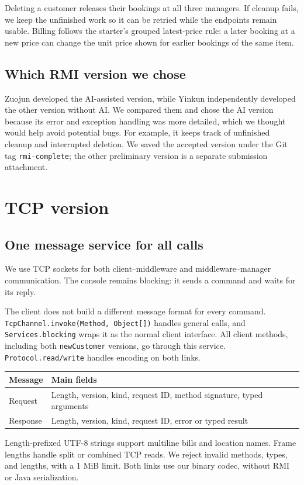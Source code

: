 \documentclass[11pt,letterpaper]{article}
\newcommand{\code}[1]{\texttt{#1}}
\begin{document}
Deleting a customer releases their bookings at all three managers. If cleanup fails,
we keep the unfinished work so it can be retried while the endpoints remain usable.
Billing follows the starter's grouped latest-price rule: a later booking at a new price
can change the unit price shown for earlier bookings of the same item.

\subsection{Which RMI version we chose}
Zuojun developed the AI-assisted version, while Yinkun independently developed the
other version without AI. We compared them and chose the AI version because its error
and exception handling was more detailed, which we thought would help avoid potential
bugs. For example, it keeps track of unfinished cleanup and interrupted deletion.
We saved the accepted version under the Git tag \code{rmi-complete}; the other
preliminary version is a separate submission attachment.

\newpage
\section{TCP version}
\subsection{One message service for all calls}
We use TCP sockets for both client--middleware and middleware--manager communication.
The console remains blocking: it sends a command and waits for its reply.

The client does not build a different message format for every command.
\code{TcpChannel.invoke(Method, Object[])} handles general calls, and
\code{Services.blocking} wraps it as the normal client interface.
All client methods, including both \code{newCustomer} versions, go through this service.
\code{Protocol.read/write} handles encoding on both links.

\begin{center}
\small
\begin{tabularx}{\linewidth}{@{}lX@{}}
\toprule
Message & Main fields\\
\midrule
Request & Length, version, kind, request ID, method signature, typed arguments\\
Response & Length, version, kind, request ID, error or typed result\\
\bottomrule
\end{tabularx}
\end{center}
Length-prefixed UTF-8 strings support multiline bills and location names. Frame lengths
handle split or combined TCP reads. We reject invalid methods, types, and lengths,
with a 1 MiB limit. Both links use our binary codec, without RMI or Java serialization.
\end{document}
